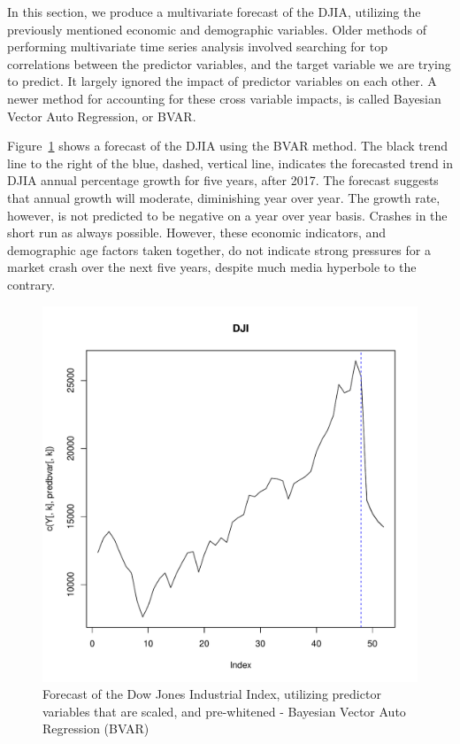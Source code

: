 \documentclass[12pt]{article}         %
\begin{document}
In this section, we produce a multivariate forecast of the DJIA, utilizing the previously mentioned economic and demographic variables.  Older methods of performing multivariate time series analysis involved searching for top correlations between the predictor variables, and the target variable we are trying to predict.  It largely ignored the impact of predictor variables on each other.  A newer method for accounting for these cross variable impacts, is called Bayesian Vector Auto Regression, or BVAR.

Figure~\ref{fig:BVARForecast} shows a forecast of the DJIA using the BVAR method.  The black trend line to the right of the blue, dashed, vertical line, indicates the forecasted trend in DJIA annual percentage growth for five years, after 2017.  The forecast suggests that annual growth will moderate, diminishing year over year.  The growth rate, however, is not predicted to be negative on a year over year basis.  Crashes in the short run as always possible.  However, these economic indicators, and demographic age factors taken together, do not indicate strong pressures for a market crash over the next five years, despite much media hyperbole to the contrary.

\begin{figure}[h!]
\begin{center}
\includegraphics[width=\linewidth]{plots/DJI_forecast.pdf}
\caption{Forecast of the Dow Jones Industrial Index, utilizing predictor variables that are scaled, and pre-whitened - Bayesian Vector Auto Regression (BVAR)}
\label{fig:BVARForecast}
\end{center}
\end{figure}
\end{document}
